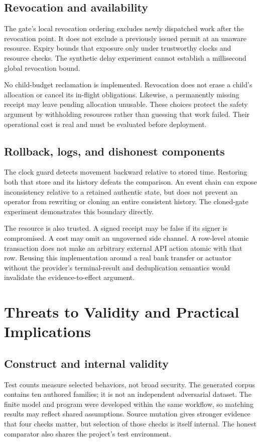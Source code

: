 \documentclass[10pt,journal,a4paper]{IEEEtran}
\begin{document}
\subsection{Revocation and availability}
The gate's local revocation ordering excludes newly dispatched work after the revocation point. It does not exclude a previously issued permit at an unaware resource. Expiry bounds that exposure only under trustworthy clocks and resource checks. The synthetic delay experiment cannot establish a millisecond global revocation bound.

No child-budget reclamation is implemented. Revocation does not erase a child's allocation or cancel its in-flight obligations. Likewise, a permanently missing receipt may leave pending allocation unusable. These choices protect the safety argument by withholding resources rather than guessing that work failed. Their operational cost is real and must be evaluated before deployment.

\subsection{Rollback, logs, and dishonest components}
The clock guard detects movement backward relative to stored time. Restoring both that store and its history defeats the comparison. An event chain can expose inconsistency relative to a retained authentic state, but does not prevent an operator from rewriting or cloning an entire consistent history. The cloned-gate experiment demonstrates this boundary directly.

The resource is also trusted. A signed receipt may be false if its signer is compromised. A cost may omit an ungoverned side channel. A row-level atomic transaction does not make an arbitrary external API action atomic with that row. Reusing this implementation around a real bank transfer or actuator without the provider's terminal-result and deduplication semantics would invalidate the evidence-to-effect argument.

\section{Threats to Validity and Practical Implications}
\subsection{Construct and internal validity}
Test counts measure selected behaviors, not broad security. The generated corpus contains ten authored families; it is not an independent adversarial dataset. The finite model and program were developed within the same workflow, so matching results may reflect shared assumptions. Source mutation gives stronger evidence that four checks matter, but selection of those checks is itself internal. The honest comparator also shares the project's test environment.
\end{document}
